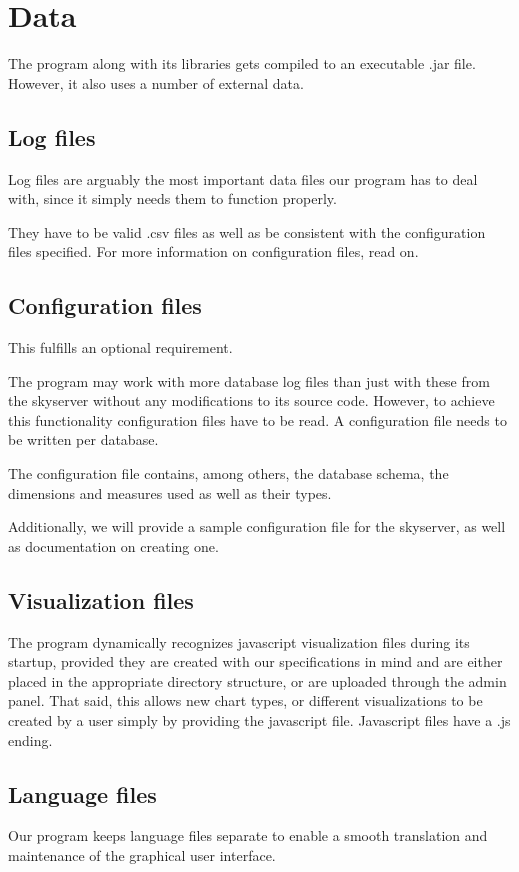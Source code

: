 \section{Data} %
The program along with its libraries gets compiled to an executable .jar file.
However, it also uses a number of external data.


\subsection{Log files}
Log files are arguably the most important data files our program has to deal with, since it simply needs them to function properly.

They have to be valid .csv files as well as be consistent with the configuration files specified. For more information on configuration files, read on.

\subsection{Configuration files}
This fulfills an optional requirement.

The program may work with more database log files than just with these from the skyserver without 
any modifications to its source code.
However, to achieve this functionality configuration files have to be read. A configuration file needs to be written per database.

The configuration file contains, among others, the database schema, the dimensions and measures used as well as their types.

Additionally, we will provide a sample configuration file for the skyserver, as well as documentation on creating one.

\subsection{Visualization files}
The program dynamically recognizes javascript visualization files during its startup, provided
they are created with our specifications in mind and are either placed in the appropriate directory structure, or are uploaded through the admin panel.
That said, this allows new chart types, or different visualizations to be created by a user simply by providing
the javascript file. Javascript files have a .js ending.

\subsection{Language files}
Our program keeps language files separate to enable a smooth translation and maintenance of the graphical user interface.

